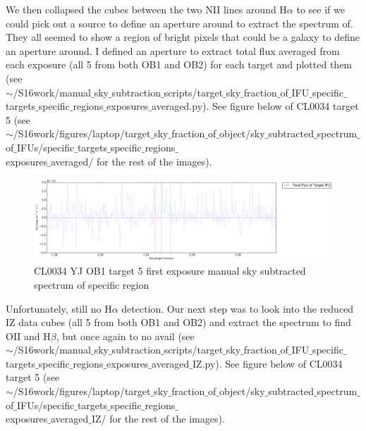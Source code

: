 \documentclass[10pt,letterpaper]{article}
\begin{document}
We then collapsed the cubes between the two NII lines around H$\alpha$ to see if we could pick out a source to define an aperture around to extract the spectrum of. They all seemed to show a region of bright pixels that could be a galaxy to define an aperture around. I defined an aperture to extract total flux averaged from each exposure (all 5 from both OB1 and OB2) for each target and plotted them (see \\$\sim$/S16work/manual$\_$sky$\_$subtraction$\_$scripts/target$\_$sky$\_$fraction$\_$of$\_$IFU$\_$specific$\_$targets$\_$specific$\_$regions$\_$exposures$\_$averaged.py). See figure below of CL0034 target 5 (see \\$\sim$/S16work/figures/laptop/target$\_$sky$\_$fraction$\_$of$\_$object/sky$\_$subtracted$\_$spectrum$\_$of$\_$IFUs/specific$\_$targets$\_$specific$\_$regions$\_$\\exposures$\_$averaged/ for the rest of the images).\\

\begin{figure}[h!]
\caption{CL0034 YJ OB1 target 5 first exposure manual sky subtracted spectrum of specific region}\label{fig:CL0034 YJ OB1 target 5 first exposure manual sky subtracted spectrum of specific region}
\includegraphics[scale=0.4]{figures/CL0034-YJ_Target_5_specific_region.pdf}
\end{figure}

Unfortunately, still no H$\alpha$ detection. Our next step was to look into the reduced IZ data cubes (all 5 from both OB1 and OB2) and extract the spectrum to find OII and H$\beta$, but once again to no avail (see \\$\sim$/S16work/manual$\_$sky$\_$subtraction$\_$scripts/target$\_$sky$\_$fraction$\_$of$\_$IFU$\_$specific$\_$targets$\_$specific$\_$regions$\_$exposures$\_$averaged$\_$IZ.py). See figure below of CL0034 target 5 (see \\$\sim$/S16work/figures/laptop/target$\_$sky$\_$fraction$\_$of$\_$object/sky$\_$subtracted$\_$spectrum$\_$of$\_$IFUs/specific$\_$targets$\_$specific$\_$regions$\_$\\exposures$\_$averaged$\_$IZ/ for the rest of the images).\\
\end{document}
